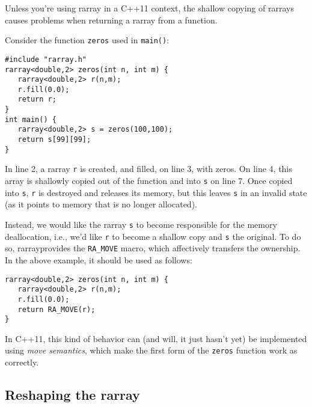 \documentclass[11pt,twoside]{article}
\begin{document}
Unless you're using rarray in a C++11 context, the shallow copying of
rarrays causes problems when returning a rarray from a function.

Consider the function \texttt{zeros} used in \texttt{main()}:
\vspace{-9pt}
\begin{framed}\vspace{-12pt}%
\begin{verbatim}
#include "rarray.h"
rarray<double,2> zeros(int n, int m) {
   rarray<double,2> r(n,m);
   r.fill(0.0);
   return r;
}
int main() {
   rarray<double,2> s = zeros(100,100);
   return s[99][99];
}
\end{verbatim}%
\vspace{-12pt}
\end{framed}\vspace{-8pt}
In line 2, a rarray \texttt{r} is created, and filled, on line 3, with zeros.
On line 4, this array is shallowly copied out of the function and into
\texttt{s} on line 7. Once copied into \texttt{s}, \texttt{r} is destroyed and releases its
memory, but this leaves \texttt{s} in an invalid state (as it points to
memory that is no longer allocated).

Instead, we would like the rarray \texttt{s} to become responsible for the
memory deallocation, i.e., we'd like \texttt{r} to become a shallow copy and \texttt{s}
the original.  To do so, rarrayprovides the \texttt{RA\_MOVE}
macro, which affectively transfers the ownership. In the above
example, it should be used as follows:
\vspace{-9pt}
\begin{framed}\vspace{-12pt}%
\begin{verbatim}
rarray<double,2> zeros(int n, int m) {
   rarray<double,2> r(n,m);
   r.fill(0.0);
   return RA_MOVE(r);
}
\end{verbatim}%
\vspace{-12pt}
\end{framed}\vspace{-8pt}

In C++11, this kind of behavior can (and will, it just hasn't yet) be implemented using
\emph{move semantics}, which make the first form of the \texttt{zeros}
function work as correctly.

\subsection{Reshaping the rarray}
\end{document}
